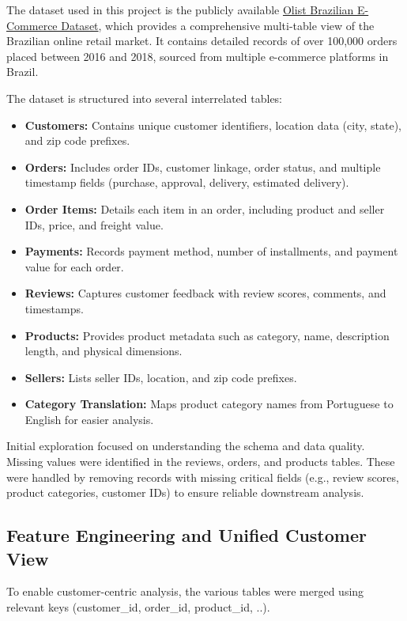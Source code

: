 \documentclass[a4paper]{article}
\begin{document}
\begin{multicols}{2}
The dataset used in this project is the publicly available \href{https://www.kaggle.com/datasets/olistbr/brazilian-ecommerce}{Olist Brazilian E-Commerce Dataset}, which provides a comprehensive multi-table view of the Brazilian online retail market. It contains detailed records of over 100,000 orders placed between 2016 and 2018, sourced from multiple e-commerce platforms in Brazil.

The dataset is structured into several interrelated tables:
\begin{itemize}
\item \textbf{Customers:} Contains unique customer identifiers, location data (city, state), and zip code prefixes.
\item \textbf{Orders:} Includes order IDs, customer linkage, order status, and multiple timestamp fields (purchase, approval, delivery, estimated delivery).
\item \textbf{Order Items:} Details each item in an order, including product and seller IDs, price, and freight value.
\item \textbf{Payments:} Records payment method, number of installments, and payment value for each order.
\item \textbf{Reviews:} Captures customer feedback with review scores, comments, and timestamps.
\item \textbf{Products:} Provides product metadata such as category, name, description length, and physical dimensions.
\item \textbf{Sellers:} Lists seller IDs, location, and zip code prefixes.
\item \textbf{Category Translation:} Maps product category names from Portuguese to English for easier analysis.
\end{itemize}

Initial exploration focused on understanding the schema and data quality. Missing values were identified in the reviews, orders, and products tables. These were handled by removing records with missing critical fields (e.g., review scores, product categories, customer IDs) to ensure reliable downstream analysis.

\subsection{Feature Engineering and Unified Customer View}

To enable customer-centric analysis, the various tables were merged using relevant keys (customer\_id, order\_id, product\_id, ..). 


\end{multicols}
\end{document}
